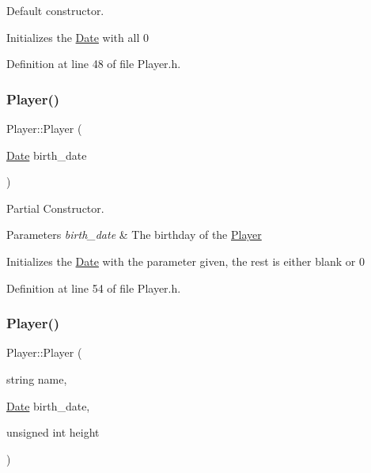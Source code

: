 Default constructor. 

Initializes the \hyperlink{class_date}{Date} with all 0 

Definition at line 48 of file Player.\+h.

\hypertarget{class_player_a74b724a1381ef548891d0f1a583450e0}{}\label{class_player_a74b724a1381ef548891d0f1a583450e0} 
\subsubsection{\texorpdfstring{Player()}{Player()}\hspace{0.1cm}{\footnotesize\ttfamily [2/3]}}
{\footnotesize\ttfamily Player\+::\+Player (\begin{DoxyParamCaption}\item[{\hyperlink{class_date}{Date}}]{birth\+\_\+date }\end{DoxyParamCaption})\hspace{0.3cm}{\ttfamily [inline]}}



Partial Constructor. 


\begin{DoxyParams}{Parameters}
{\em birth\+\_\+date} & The birthday of the \hyperlink{class_player}{Player}\\
\hline
\end{DoxyParams}
Initializes the \hyperlink{class_date}{Date} with the parameter given, the rest is either blank or 0 

Definition at line 54 of file Player.\+h.

\hypertarget{class_player_a61933c5f779b97caea5e13b58bbb06da}{}\label{class_player_a61933c5f779b97caea5e13b58bbb06da} 
\subsubsection{\texorpdfstring{Player()}{Player()}\hspace{0.1cm}{\footnotesize\ttfamily [3/3]}}
{\footnotesize\ttfamily Player\+::\+Player (\begin{DoxyParamCaption}\item[{string}]{name,  }\item[{\hyperlink{class_date}{Date}}]{birth\+\_\+date,  }\item[{unsigned int}]{height }\end{DoxyParamCaption})\hspace{0.3cm}{\ttfamily [inline]}}



